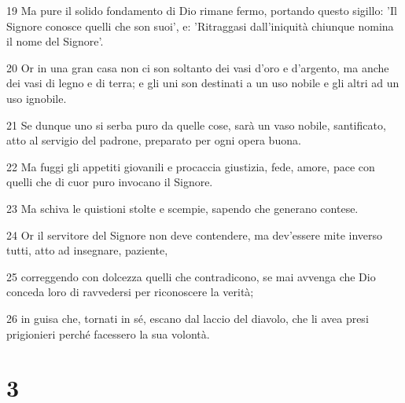 \par 19 Ma pure il solido fondamento di Dio rimane fermo, portando questo sigillo: 'Il Signore conosce quelli che son suoi', e: 'Ritraggasi dall'iniquità chiunque nomina il nome del Signore'.
\par 20 Or in una gran casa non ci son soltanto dei vasi d'oro e d'argento, ma anche dei vasi di legno e di terra; e gli uni son destinati a un uso nobile e gli altri ad un uso ignobile.
\par 21 Se dunque uno si serba puro da quelle cose, sarà un vaso nobile, santificato, atto al servigio del padrone, preparato per ogni opera buona.
\par 22 Ma fuggi gli appetiti giovanili e procaccia giustizia, fede, amore, pace con quelli che di cuor puro invocano il Signore.
\par 23 Ma schiva le quistioni stolte e scempie, sapendo che generano contese.
\par 24 Or il servitore del Signore non deve contendere, ma dev'essere mite inverso tutti, atto ad insegnare, paziente,
\par 25 correggendo con dolcezza quelli che contradicono, se mai avvenga che Dio conceda loro di ravvedersi per riconoscere la verità;
\par 26 in guisa che, tornati in sé, escano dal laccio del diavolo, che li avea presi prigionieri perché facessero la sua volontà.

\chapter{3}

